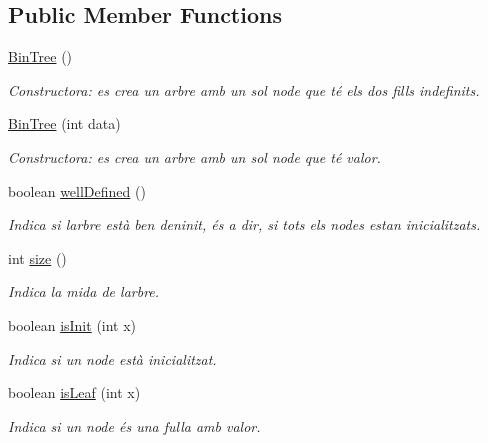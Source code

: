 \subsection*{Public Member Functions}
\begin{DoxyCompactItemize}
\item 
\mbox{\label{classdomini_1_1utils_1_1BinTree_a46082da82a1186c5a99ae68eee6ece13}} 
\hyperlink{classdomini_1_1utils_1_1BinTree_a46082da82a1186c5a99ae68eee6ece13}{Bin\+Tree} ()
\begin{DoxyCompactList}\small\item\em Constructora\+: es crea un arbre amb un sol node que té els dos fills indefinits. \end{DoxyCompactList}\item 
\hyperlink{classdomini_1_1utils_1_1BinTree_a83904c6ebf931ba29a134be5f29a66c7}{Bin\+Tree} (int data)
\begin{DoxyCompactList}\small\item\em Constructora\+: es crea un arbre amb un sol node que té valor. \end{DoxyCompactList}\item 
boolean \hyperlink{classdomini_1_1utils_1_1BinTree_a30f097b37ebea20379d9c2930e8fa27f}{well\+Defined} ()
\begin{DoxyCompactList}\small\item\em Indica si l\textquotesingle{}arbre està ben deninit, és a dir, si tots els nodes estan inicialitzats. \end{DoxyCompactList}\item 
int \hyperlink{classdomini_1_1utils_1_1BinTree_afb98cb560c437784fe3ce1b8d6aa046e}{size} ()
\begin{DoxyCompactList}\small\item\em Indica la mida de l\textquotesingle{}arbre. \end{DoxyCompactList}\item 
boolean \hyperlink{classdomini_1_1utils_1_1BinTree_aefcc4df5059f9893eba9998cb267eced}{is\+Init} (int x)
\begin{DoxyCompactList}\small\item\em Indica si un node està inicialitzat. \end{DoxyCompactList}\item 
boolean \hyperlink{classdomini_1_1utils_1_1BinTree_a37030e961f5613a5c74984ac002d965b}{is\+Leaf} (int x)
\begin{DoxyCompactList}\small\item\em Indica si un node és una fulla amb valor. \end{DoxyCompactList}\item 

\end{DoxyCompactItemize}
